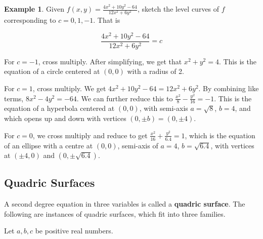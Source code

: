 \documentclass[11pt]{article}
\theoremstyle{plain} %
\theoremstyle{definition}
\theoremstyle{example}
\newtheorem*{example}{Example}
\theoremstyle{remark}
\begin{document}
\begin{example}
Given $f(x,y) = \frac{4x^2+10y^2-64}{12x^2+6y^2}$, sketch the level curves of $f$ corresponding to $c=0,1,-1$. That is

$$\frac{4x^2+10y^2-64}{12x^2+6y^2} = c$$

\end{example}

For $c=-1$, cross multiply. After simplifying, we get that $x^2+y^2 = 4$. This is the equation of a circle centered at $(0,0)$ with a radius of 2. 

For $c=1$, cross multiply. We get $4x^2+10y^2-64 = 12x^2+6y^2$. By combining like terms, $8x^2-4y^2=-64$. We can further reduce this to $\frac{x^2}{8}-\frac{y^2}{16} = -1$. This is the equation of a hyperbola centered at $(0,0)$, with semi-axis $a=\sqrt{8}$, $b=4$, and which opens up and down with vertices $(0, \pm b) = (0, \pm 4)$. 

For $c=0$, we cross multiply and reduce to get $\frac{x^2}{16} + \frac{y^2}{6.4} = 1$, which is the equation of an ellipse with a centre at $(0,0)$, semi-axis of $a=4$, $b=\sqrt{6.4}$, with vertices at $(\pm 4, 0)$ and $(0, \pm \sqrt{6.4})$.




\subsection{Quadric Surfaces}

A second degree equation in three variables is called a \textbf{quadric surface}. The following are instances of quadric surfaces, which fit into three families. 

Let $a, b, c$ be positive real numbers. 
\end{document}
